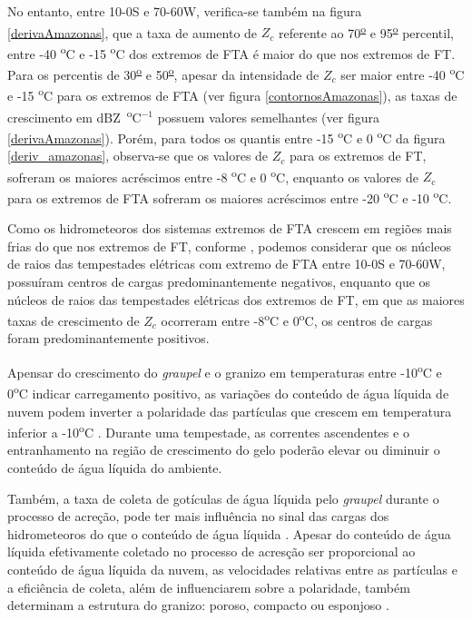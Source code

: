 No entanto, entre 10-0S e 70-60W, verifica-se também na figura \ref{derivaAmazonas}, que a taxa de aumento de $Z_c$ referente ao 70\textsuperscript{\underline{o}} e 95\textsuperscript{\underline{o}} percentil, entre -40 \textsuperscript{o}C e -15 \textsuperscript{o}C dos extremos de FTA é maior do que nos extremos de FT. Para os percentis de 30\textsuperscript{\underline{o}} e 50\textsuperscript{\underline{o}}, apesar da intensidade de $Z_c$ ser maior entre -40 \textsuperscript{o}C e -15 \textsuperscript{o}C para os extremos de FTA (ver figura \ref{contornosAmazonas}), as taxas de crescimento em dBZ~\textsuperscript{o}C$^{-1}$ possuem valores semelhantes (ver figura \ref{derivaAmazonas}). Porém, para todos os quantis entre -15 \textsuperscript{o}C e 0 \textsuperscript{o}C da figura \ref{deriv_amazonas}, observa-se que os valores de $Z_c$ para os extremos de FT, sofreram os maiores acréscimos entre -8 \textsuperscript{o}C e 0 \textsuperscript{o}C, enquanto os valores de $Z_c$ para os extremos de FTA sofreram os maiores acréscimos entre -20 \textsuperscript{o}C e -10 \textsuperscript{o}C. %

Como os hidrometeoros dos sistemas extremos de FTA crescem em regiões mais frias do que nos extremos de FT,
conforme , podemos considerar que os núcleos de raios das tempestades elétricas com extremo de FTA entre 10-0S e 70-60W, possuíram centros de cargas predominantemente negativos, enquanto que os núcleos de raios das tempestades elétricas dos extremos de FT, em que as maiores taxas de crescimento de $Z_c$ ocorreram entre  -8\textsuperscript{o}C e 0\textsuperscript{o}C, os centros de cargas foram predominantemente positivos.

Apensar do crescimento do \textit{graupel} e o granizo em temperaturas entre -10\textsuperscript{o}C e 0\textsuperscript{o}C indicar carregamento positivo, as variações do conteúdo de água líquida de nuvem  podem inverter a polaridade das partículas que crescem em temperatura inferior a -10\textsuperscript{o}C \cite{Takahashi1978}. Durante uma tempestade, as correntes ascendentes e o entranhamento na região de crescimento do gelo poderão elevar ou diminuir o conteúdo de água líquida do ambiente.

Também, a taxa de coleta de gotículas de água líquida pelo \textit{graupel} durante o processo de acreção, pode ter mais influência no sinal das cargas dos hidrometeoros do que o conteúdo de água líquida \cite{jayaratne1983,saunders1991effect,brooks1997,Takahashi2002}. 
Apesar do conteúdo de água líquida efetivamente coletado no processo de acresção ser proporcional ao conteúdo de água líquida da nuvem, as velocidades relativas entre as partículas e a eficiência de coleta, além de influenciarem sobre a polaridade, também determinam a estrutura do granizo: poroso, compacto ou esponjoso \cite[p.~335]{mason1971_2ed}.  
 
